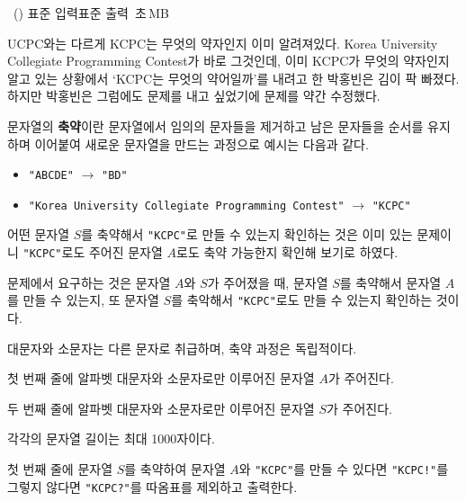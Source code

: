 \begin{problem}{\kcpcprobacronym\ (\kcpcprobacronymshort)}
    {표준 입력}{표준 출력}
    {\kcpcprobacronymtime\,초}{\kcpcprobacronymmemory\,MB}{}
    
    UCPC와는 다르게 KCPC는 무엇의 약자인지 이미 알려져있다. Korea University Collegiate Programming Contest가 바로 그것인데, 이미 KCPC가 무엇의 약자인지 알고 있는 상황에서 `KCPC는 무엇의 약어일까'를 내려고 한 박홍빈은 김이 팍 빠졌다. 하지만 박홍빈은 그럼에도 문제를 내고 싶었기에 문제를 약간 수정했다. 
    
    문자열의 \textbf{축약}이란 문자열에서 임의의 문자들을 제거하고 남은 문자들을 순서를 유지하며 이어붙여 새로운 문자열을 만드는 과정으로 예시는 다음과 같다.
    
    \begin{itemize}
    \item \texttt{"ABCDE"} $ \to $ \texttt{"BD"}
    \item \texttt{"Korea University Collegiate Programming Contest"} $ \to $ \texttt{"KCPC"}
    \end{itemize}
    
    어떤 문자열 $ S $를 축약해서 \texttt{"KCPC"}로 만들 수 있는지 확인하는 것은 이미 있는 문제이니 \texttt{"KCPC"}로도 주어진 문자열 $ A $로도 축약 가능한지 확인해 보기로 하였다.
    
    문제에서 요구하는 것은 문자열 $ A $와 $ S $가 주어졌을 때, 문자열 $ S $를 축약해서 문자열 $ A $를 만들 수 있는지, 또 문자열 $ S $를 축악해서 \texttt{"KCPC"}로도 만들 수 있는지 확인하는 것이다.
    
    대문자와 소문자는 다른 문자로 취급하며, 축약 과정은 독립적이다.
    
    \InputFile
    첫 번째 줄에 알파벳 대문자와 소문자로만 이루어진 문자열 $ A $가 주어진다.
    
    두 번째 줄에 알파벳 대문자와 소문자로만 이루어진 문자열 $ S $가 주어진다. 
    
    각각의 문자열 길이는 최대 1000자이다.
    
    \OutputFile
    첫 번째 줄에 문자열 $ S $를 축약하여 문자열 $ A $와 \texttt{"KCPC"}를 만들 수 있다면 \texttt{"KCPC!"}를 그렇지 않다면 \texttt{"KCPC?"}를 따옴표를 제외하고 출력한다.
    
    \Examples
    \begin{example}
    \end{example}
\end{problem}

